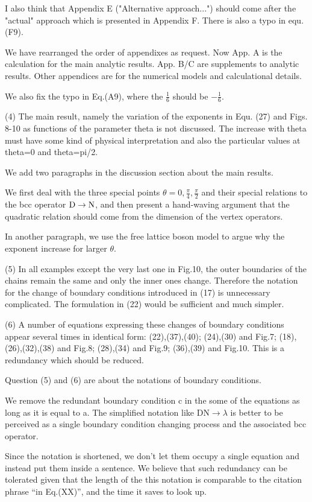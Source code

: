 \documentclass{article}
\newcommand{\reply}[1]{{\color{black}#1}}
\begin{document}
I also think that Appendix E ("Alternative approach...") should come after the "actual" approach which is presented in Appendix F. There is also a typo in equ.(F9).

\reply{We have rearranged the order of appendixes as request. Now App. A is the calculation for the main analytic results. App. B/C are supplements to analytic results. Other appendices are for the numerical models and calculational details. 

We also fix the typo in Eq.(A9), where the $\frac{1}{6}$ should be $-\frac{1}{6}$.}

(4) The main result, namely the variation of the exponents in Equ. (27) and Figs. 8-10 as functions of the parameter theta is not discussed. The increase with theta must have some kind of physical interpretation and also the particular values at theta=0 and theta=pi/2.

\reply{We add two paragraphs in the discussion section about the main results. 

We first deal with the three special points $\theta = 0, \frac{\pi}{4}, \frac{\pi}{2}$ and their special relations to the bcc operator ${\rm D} \rightarrow {\rm N}$, and then present a hand-waving argument that the quadratic relation should come from the dimension of the vertex operators. 

In another paragraph, we use the free lattice boson model to argue why the exponent increase for larger $\theta$. 
}

(5) In all examples except the very last one in Fig.10, the outer boundaries of the chains remain the same and only the inner ones change. Therefore the notation for the change of boundary conditions introduced in (17) is unnecessary complicated. The formulation in (22) would be sufficient and much simpler.

(6) A number of equations expressing these changes of boundary conditions appear several times in identical form: (22),(37),(40); (24),(30) and Fig.7; (18),(26),(32),(38) and Fig.8; (28),(34) and Fig.9; (36),(39) and Fig.10. This is a redundancy which should be reduced.

\reply{Question (5) and (6) are about the notations of boundary conditions. 

We remove the redundant boundary condition c in the some of the equations as long as it is equal to a. The simplified notation like $\text{DN} \rightarrow \lambda$ is better to be perceived as a single boundary condition changing process and the associated bcc operator. 

Since the notation is shortened, we don't let them occupy a single equation and instead put them inside a sentence. We believe that such redundancy can be tolerated given that the length of the this notation is comparable to the citation phrase ``in Eq.(XX)'', and the time it saves to look up. }
\end{document}
